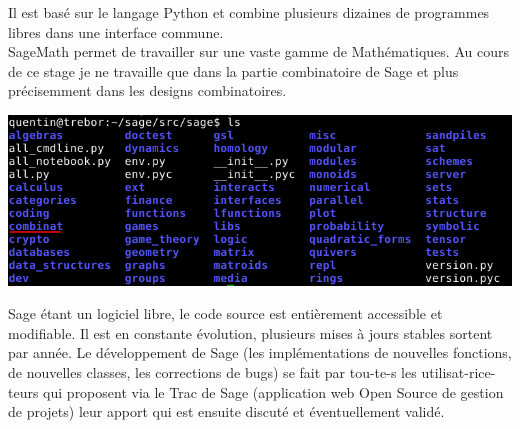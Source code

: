 \documentclass[a4paper]{article}
\begin{document}
Il est basé sur le langage Python et combine plusieurs dizaines de programmes libres dans une interface commune.\\
SageMath permet de travailler sur une vaste gamme de Mathématiques. Au cours de ce stage je ne travaille que dans la partie combinatoire de Sage et plus précisemment dans les designs combinatoires.
\vspace{3\baselineskip}
\begin{center}
  \includegraphics[scale=0.6]{matieres.jpg}
\end{center}
\vspace{3\baselineskip}
Sage étant un logiciel libre, le code source est entièrement accessible et modifiable. Il est en constante évolution, plusieurs mises à jours stables sortent par année. Le développement de Sage (les implémentations de nouvelles fonctions, de nouvelles classes, les corrections de bugs) se fait par tou-te-s les utilisat-rice-teurs qui proposent via le Trac de Sage (application web Open Source de gestion de projets) leur apport qui est ensuite discuté et éventuellement validé.








\newpage
\end{document}
